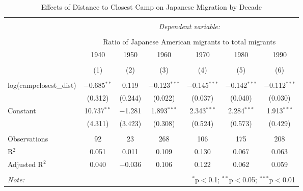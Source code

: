
\begin{table}[!htbp] \centering 
  \caption{Effects of Distance to Closest Camp on Japanese Migration by Decade} 
  \label{} 
\begin{tabular}{@{\extracolsep{5pt}}lcccccc} 
\\[-1.8ex]\hline 
\hline \\[-1.8ex] 
 & \multicolumn{6}{c}{\textit{Dependent variable:}} \\ 
\cline{2-7} 
\\[-1.8ex] & \multicolumn{6}{c}{Ratio of Japanese American migrants to total migrants} \\ 
 & 1940 & 1950 & 1960 & 1970 & 1980 & 1990 \\ 
\\[-1.8ex] & (1) & (2) & (3) & (4) & (5) & (6)\\ 
\hline \\[-1.8ex] 
 log(campclosest\_dist) & $-$0.685$^{**}$ & 0.119 & $-$0.123$^{***}$ & $-$0.145$^{***}$ & $-$0.142$^{***}$ & $-$0.112$^{***}$ \\ 
  & (0.312) & (0.244) & (0.022) & (0.037) & (0.040) & (0.030) \\ 
  Constant & 10.737$^{**}$ & $-$1.281 & 1.893$^{***}$ & 2.343$^{***}$ & 2.284$^{***}$ & 1.913$^{***}$ \\ 
  & (4.311) & (3.423) & (0.308) & (0.524) & (0.573) & (0.429) \\ 
 \hline \\[-1.8ex] 
Observations & 92 & 23 & 268 & 106 & 175 & 208 \\ 
R$^{2}$ & 0.051 & 0.011 & 0.109 & 0.130 & 0.067 & 0.063 \\ 
Adjusted R$^{2}$ & 0.040 & $-$0.036 & 0.106 & 0.122 & 0.062 & 0.059 \\ 
\hline 
\hline \\[-1.8ex] 
\textit{Note:}  & \multicolumn{6}{r}{$^{*}$p$<$0.1; $^{**}$p$<$0.05; $^{***}$p$<$0.01} \\ 
\end{tabular} 
\end{table} 
